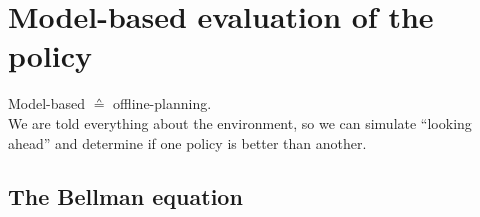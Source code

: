 \section{Model-based evaluation of the policy}

\begin{frame} 
    \begin{center} 
    Model-based $\corresponds$ offline-planning.\\
    We are told everything about the environment, so we can simulate ``looking ahead'' and determine if one policy is better than another.
    \end{center}
\end{frame}

\subsection{The Bellman equation}

